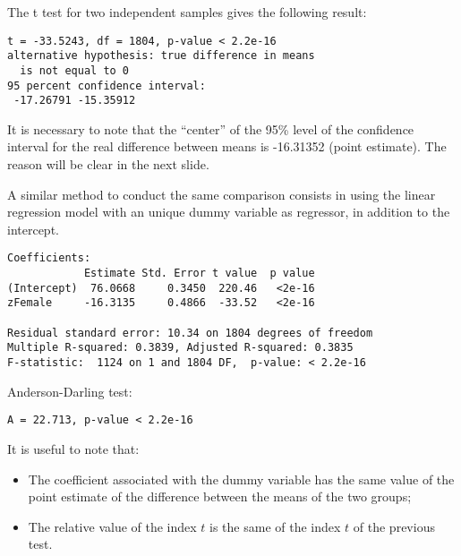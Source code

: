 \begin{frame}[fragile]
  \vspace{0.5cm}
  The t test for two independent samples gives the following result:
  \begin{small}
    \begin{verbatim}
t = -33.5243, df = 1804, p-value < 2.2e-16
alternative hypothesis: true difference in means
  is not equal to 0 
95 percent confidence interval:
 -17.26791 -15.35912 
    \end{verbatim}
  \end{small}
  It is necessary to note that the ``center'' of the 95\% level of the confidence interval for the real difference between means is  -16.31352 (point estimate). The reason will be clear in the next slide.
\end{frame}

\begin{frame}[fragile]
  A similar method to conduct the same comparison consists in using the linear regression model with an unique dummy variable as regressor, in addition to the intercept.
  \begin{small}
    \begin{verbatim}
Coefficients:
            Estimate Std. Error t value  p value   
(Intercept)  76.0668     0.3450  220.46   <2e-16
zFemale     -16.3135     0.4866  -33.52   <2e-16 

Residual standard error: 10.34 on 1804 degrees of freedom
Multiple R-squared: 0.3839,	Adjusted R-squared: 0.3835 
F-statistic:  1124 on 1 and 1804 DF,  p-value: < 2.2e-16 
    \end{verbatim}
  \end{small}
  Anderson-Darling test:\\
  \begin{small}
    \begin{verbatim}
A = 22.713, p-value < 2.2e-16
    \end{verbatim}
  \end{small}
\end{frame}

\begin{frame}
  \vspace{0.75cm}
  It is useful to note that:
  \begin{itemize}
    \vspace{0.5cm}
    \item The coefficient associated with the dummy variable has the same value of the point estimate of the difference between the means of the two groups;
    \vspace{0.5cm}
    \item The relative value of the index $ t $ is the same of the index $ t $ of the previous test.
  \end{itemize}
\end{frame}

